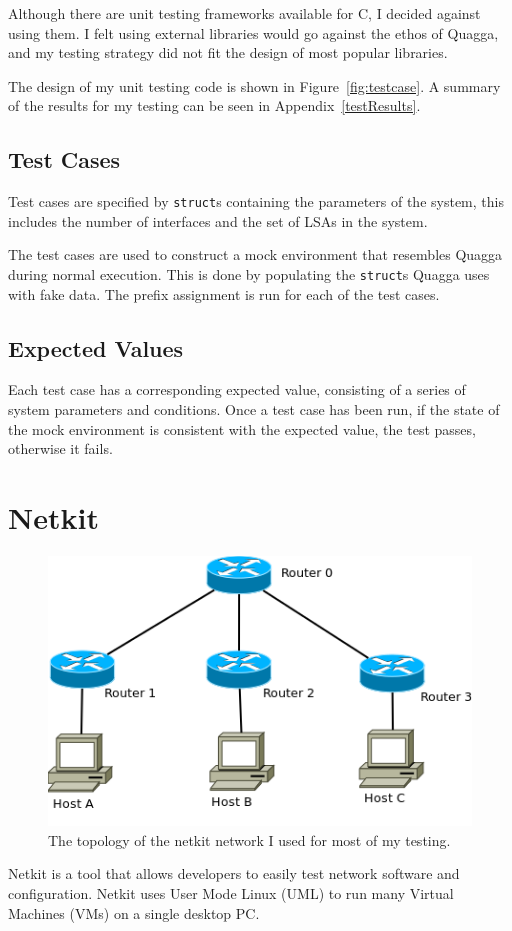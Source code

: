 \documentclass[12pt,a4paper,twoside]{report}
\begin{document}
Although there are unit testing frameworks available for C, I decided against
using them.  I felt using external libraries  would go against the ethos of
Quagga, and my testing strategy did not fit the design of most popular
libraries. 

The design of my unit testing code is shown in Figure~\ref{fig:testcase}. A
summary of the results for my testing can be seen in
Appendix~\ref{testResults}.

\subsection{Test Cases}
Test cases are specified by \texttt{struct}s containing the parameters of the
system, this includes the number of interfaces and the set of LSAs in the
system. 

The test cases are used to construct a mock environment that resembles
Quagga during normal execution. This is done by populating the \texttt{struct}s
Quagga uses with fake data. The prefix assignment is run for each of the test
cases. 

\subsection{Expected Values}
Each test case has a corresponding expected value, consisting of a
series of system parameters and conditions. Once a test case has been run, if
the state of the mock environment is consistent with the expected value, the
test passes, otherwise it fails. 

\section{Netkit} 
\begin{figure}
\begin{center}
	\includegraphics[width=\linewidth]{../Diagrams/Network/MainNetkit.png}
	\caption{The topology of the netkit network I used for most of my testing.}
	\label{fig:NetkitTopology}
\end{center}
\end{figure}
Netkit is a tool that allows developers to easily test network software and
configuration. Netkit uses User Mode Linux (UML)  to run many Virtual Machines (VMs) 
on a single desktop PC. 
\end{document}
